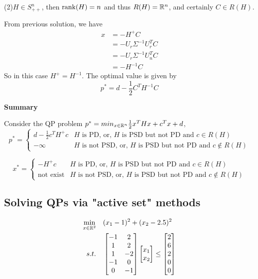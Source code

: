 (2)$H\in S^n_{++}$, then $\operatorname{rank}(H) = n$ and thus $R(H)=\mathbb{R}^n$, and certainly $C \in R(H)$.

From previous solution, we have
\begin{align*}
x 
&= -H^{+}C\\
&= -U_r \Sigma^{-1} U_r^T C\\
&= -U_r \Sigma^{-1} U_n^T C\\
&= - H^{-1} C
\end{align*}
So in this case $H^+ = H^{-1}$. The optimal value is given by
$$p^* = d - \frac{1}{2}C^TH^{-1}C$$


\textbf{Summary }

Consider the QP problem $p^* = min_{x\in \mathbb{R}^n}\frac{1}{2}x^THx + c^Tx + d$,
\begin{equation}
p^* = \left\{
\begin{array}{lr}
d - \frac{1}{2}c^TH^+c &\text{$H$ is PD, or, $H$ is PSD but not PD and $c \in R(H)$}\\
-\infty &\text{$H$ is not PSD, or, $H$ is PSD but not PD and $c\notin R(H)$}
\end{array}
\right.\nonumber
\end{equation}

\begin{equation}
x^* = \left\{
\begin{array}{lr}
-H^+c &\text{$H$ is PD, or, $H$ is PSD but not PD and $c \in R(H)$}\\
\text{not exist} &\text{$H$ is not PSD, or, $H$ is PSD but not PD and $c\notin R(H)$}
\end{array}
\right.\nonumber
\end{equation}

\vspace{0.5cm}
\subsection{Solving QPs via "active set" methods}

\begin{align*}
\min_{x\in \mathbb{R}^2} \quad & (x_1 - 1)^2 + (x_2 - 2.5)^2 \\
s.t. \quad&
\begin{bmatrix}
-1&2\\
1&2\\
1&-2\\
-1&0\\
0&-1
\end{bmatrix}
\begin{bmatrix}
x_1\\
x_2
\end{bmatrix}
\leq
\begin{bmatrix}
2\\
6\\
2\\
0\\
0
\end{bmatrix}
\end{align*}

